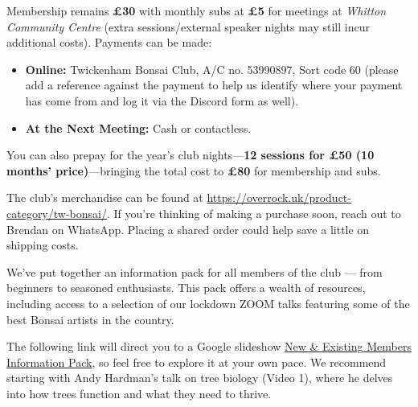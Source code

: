 \label{2024-12-events}


\noindent
Membership remains \textbf{£30} with monthly subs at \textbf{£5} for meetings at \emph{Whitton Community Centre} (extra sessions/external speaker nights may still incur additional costs). 
Payments can be made:
	
\begin{itemize}
	\item \textbf{Online:} Twickenham Bonsai Club, A/C no. 53990897, Sort code 60 (please add a reference against the payment to help us identify where your payment has come from and log it via the Discord form as well).
     
	\item \textbf{At the Next Meeting:} Cash or contactless.  
\end{itemize}
	
You can also prepay for the year's club nights---\textbf{12 sessions for £50 (10 months' price)}---bringing the total cost to \textbf{£80} for membership and subs.
	
\noindent
The club's merchandise can be found at \url{https://overrock.uk/product-category/tw-bonsai/}.
If you're thinking of making a purchase soon, reach out to Brendan on WhatsApp. 
Placing a shared order could help save a little on shipping costs.
	
\noindent
We've put together an information pack for all members of the club --- from beginners to seasoned enthusiasts.
This pack offers a wealth of resources, including access to a selection of our lockdown ZOOM talks featuring some of the best Bonsai artists in the country.

The following link will direct you to a Google slideshow \href{https://docs.google.com/presentation/d/1L5SRA_ZSvnGMLbRt0CSf-Uz7BaiOfxOs7OUHMM_XrTY/edit?usp=sharing}{New \& Existing Members Information Pack}, so feel free to explore it at your own pace. 
We recommend starting with Andy Hardman's talk on tree biology (Video 1), where he delves into how trees function and what they need to thrive.

